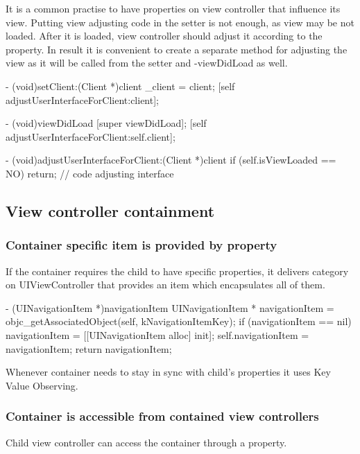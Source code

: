 \documentclass[10pt]{extarticle}
\newenvironment{codelisting}
{\footnotesize\mdframed[middlelinewidth=0.5pt, middlelinecolor=BaliHaiColor, skipabove=15pt]\verbatim}
{\endverbatim\endmdframed\vspace{12pt}\normalsize}
\begin{document}
It is a common practise to have properties on view controller that influence its view. Putting view adjusting code in the setter is not enough, as view may be not loaded. After it is loaded, view controller should adjust it according to the property. In result it is convenient to create a separate method for adjusting the view as it will be called from the setter and -viewDidLoad as well.

\begin{codelisting}
- (void)setClient:(Client *)client
{
    _client = client;
    [self adjustUserInterfaceForClient:client];
}

- (void)viewDidLoad
{
    [super viewDidLoad];
    [self adjustUserInterfaceForClient:self.client];
}

- (void)adjustUserInterfaceForClient:(Client *)client
{
    if (self.isViewLoaded == NO) return;
    // code adjusting interface
}
\end{codelisting}


\subsection{View controller containment}


\subsubsection{Container specific item is provided by property}


If the container requires the child to have specific properties, it delivers category on UIViewController that provides an item which encapsulates all of them.

\begin{codelisting}
- (UINavigationItem *)navigationItem
{
    UINavigationItem * navigationItem = objc_getAssociatedObject(self, kNavigationItemKey);
    if (navigationItem == nil) {
        navigationItem = [[UINavigationItem alloc] init];
        self.navigationItem = navigationItem;
    }
    return navigationItem;
}
\end{codelisting}

Whenever container needs to stay in sync with child's properties it uses Key Value Observing.


\subsubsection{Container is accessible from contained view controllers}

Child view controller can access the container through a property.
\end{document}
